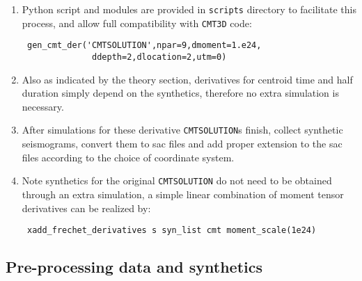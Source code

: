 \documentclass[12pt,titlepage,fleqn]{article}
\begin{document}
\begin{enumerate}
\item 
Python script and modules are provided in \verb+scripts+ directory to facilitate this process, and allow full compatibility with \verb+CMT3D+ code:
\begin{verbatim}
 gen_cmt_der('CMTSOLUTION',npar=9,dmoment=1.e24,
              ddepth=2,dlocation=2,utm=0)
\end{verbatim}
\item Also as indicated by the theory section, derivatives for centroid time and half duration simply depend on the synthetics, therefore no extra simulation is necessary.
\item After simulations for these derivative \verb+CMTSOLUTION+s finish, collect synthetic seismograms, convert them to sac files and add proper extension to the sac files according to the choice of coordinate system.  

\item Note synthetics for the original \verb+CMTSOLUTION+ do not need to be obtained through an extra simulation, a simple linear combination of moment tensor derivatives can be realized by:
\begin{verbatim}
 xadd_frechet_derivatives s syn_list cmt moment_scale(1e24)
\end{verbatim}

\end{enumerate}

\subsection{Pre-processing data and synthetics}
\end{document}
